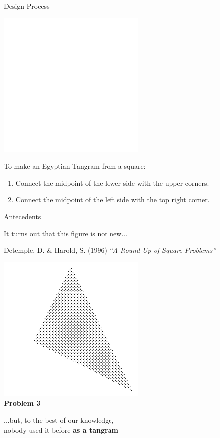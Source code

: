 \documentclass[14pt]{beamer}
\begin{document}
    \begin{frame}{Design Process}
        \begin{center}
            \includegraphics[height=18ex]{figures/figure001b.pdf}
        \end{center}

        To make an Egyptian Tangram from a square:

        {\small \begin{enumerate}
            \item Connect the midpoint of the lower side with the upper corners.
            \item Connect the midpoint of the left side with the top right corner.
        \end{enumerate}}
    \end{frame}


    \begin{frame}{Antecedents}
        \begin{center}
            It turns out that this figure is not new...

            \bigskip\medskip

            {\footnotesize Detemple, D. \& Harold, S. (1996) \emph{``A Round-Up of Square Problems''}}\\

            \bigskip

            \includegraphics[height=14ex]{figures/figure000f.pdf}\\[-1ex]{\footnotesize \textbf{Problem 3}}

            \bigskip

            ...but, to the best of our knowledge,\\nobody used it before \textbf{as a tangram}
        \end{center}
    \end{frame}
\end{document}
